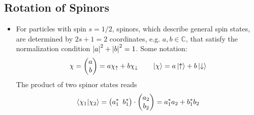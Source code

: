 \documentclass[11pt, a4paper]{article}
\newcommand{\ua}{\uparrow}  %
\newcommand{\da}{\downarrow}  %
\begin{document}
\subsection{Rotation of Spinors}
\begin{itemize}
	\item For particles with spin $ s = 1/2 $, spinors, which describe general spin states, are determined by $ 2s + 1 = 2 $ coordinates, e.g. $ a, b \in \mathbb{C} $, that satisfy the normalization condition $ \abs{a}^{2} + \abs{b}^{2} = 1 $. Some notation:
	\begin{equation*}
		\chi = 
		\begin{pmatrix}
			a\\
			b
		\end{pmatrix}
		= a \chi_{\ua} + b\chi_{\da} \qquad \ket{\chi} = a \ket{\ua} + b \ket{\da}
	\end{equation*}
	The product of two spinor states reads
	\begin{equation*}
		\braket{\chi_{1}}{\chi_{2}} = \big(a_{1}^{*} \, \ b_{1}^{*}\big)\cdot 
		\begin{pmatrix}
			a_{2}\\
			b_{2}
		\end{pmatrix}
		= a_{1}^{*}a_{2} + b_{1}^{*}b_{2}
	\end{equation*}
	

\end{itemize}
\end{document}

